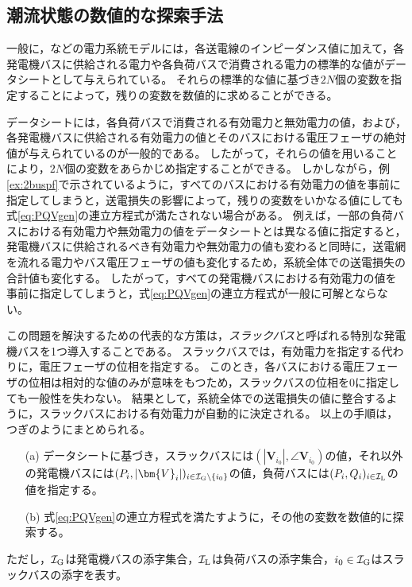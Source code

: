\documentclass[tombow,dvipdfmx]{corona-a5-1.1}
\begin{document}
\subsection{潮流状態の数値的な探索手法}


一般に，などの電力系統モデルには，各送電線のインピーダンス値に加えて，各発電機バスに供給される電力や各負荷バスで消費される電力の標準的な値がデータシートとして与えられている。
それらの標準的な値に基づき$2N$個の変数を指定することによって，残りの変数を数値的に求めることができる。


データシートには，各負荷バスで消費される有効電力と無効電力の値，および，各発電機バスに供給される有効電力の値とそのバスにおける電圧フェーザの絶対値が与えられているのが一般的である。
したがって，それらの値を用いることにより，$2N$個の変数をあらかじめ指定することができる。
しかしながら，例\ref{ex:2buspf}で示されているように，すべてのバスにおける有効電力の値を事前に指定してしまうと，送電損失の影響によって，残りの変数をいかなる値にしても式\ref{eq:PQVgen}の連立方程式が満たされない場合がある。
例えば，一部の負荷バスにおける有効電力や無効電力の値をデータシートとは異なる値に指定すると，発電機バスに供給されるべき有効電力や無効電力の値も変わると同時に，送電網を流れる電力やバス電圧フェーザの値も変化するため，系統全体での送電損失の合計値も変化する。
したがって，すべての発電機バスにおける有効電力の値を事前に指定してしまうと，式\ref{eq:PQVgen}の連立方程式が一般に可解とならない。


この問題を解決するための代表的な方策は，\emph{スラックバス}と呼ばれる特別な発電機バスを1つ導入することである。
スラックバスでは，有効電力を指定する代わりに，電圧フェーザの位相を指定する。
このとき，各バスにおける電圧フェーザの位相は相対的な値のみが意味をもつため，スラックバスの位相を0に指定しても一般性を失わない。
結果として，系統全体での送電損失の値に整合するように，スラックバスにおける有効電力が自動的に決定される。
以上の手順は，つぎのようにまとめられる。
\begin{itemize}
\item[(a)] データシートに基づき，スラックバスには$(|\bm{V}_{i_0}|,\angle \bm{V}_{i_0})$の値，それ以外の発電機バスには$(P_i,|\bm{V}_{i}|)_{i \in \mathcal{I}_{\rm G}\setminus\{i_0\} }$の値，負荷バスには$(P_i,Q_i)_{i \in \mathcal{I}_{\rm L}}$の値を指定する。
\item[(b)] 式\ref{eq:PQVgen}の連立方程式を満たすように，その他の変数を数値的に探索する。
\end{itemize}
ただし，$\mathcal{I}_{\rm G}$は発電機バスの添字集合，$\mathcal{I}_{\rm L}$は負荷バスの添字集合，$i_0 \in \mathcal{I}_{\rm G}$はスラックバスの添字を表す。
\end{document}
